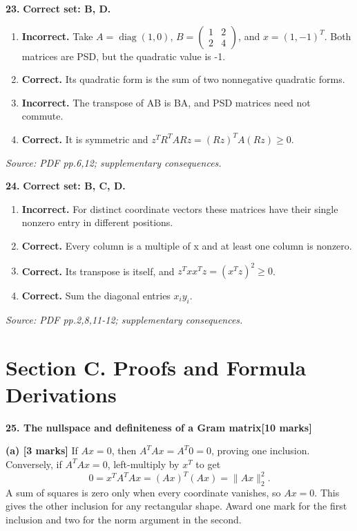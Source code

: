 \documentclass[11pt,a4paper]{article}
\begin{document}
\par\noindent\begin{minipage}{\linewidth}
\textbf{23.} \textbf{Correct set: B, D.}
\begin{enumerate}[label=(\Alph*),leftmargin=8mm,itemsep=2pt,topsep=2pt]
\item \textbf{Incorrect.} Take \(A=\operatorname{diag}(1,0)\), \(B=\begin{pmatrix}1&2\\2&4\end{pmatrix}\), and \(x=(1,-1)^T\). Both matrices are PSD, but the quadratic value is -1.
\item \textbf{Correct.} Its quadratic form is the sum of two nonnegative quadratic forms.
\item \textbf{Incorrect.} The transpose of AB is BA, and PSD matrices need not commute.
\item \textbf{Correct.} It is symmetric and \(z^TR^TARz=(Rz)^TA(Rz)\geq0\).
\end{enumerate}
{\footnotesize\textit{Source: PDF pp.6,12; supplementary consequences.}}

\end{minipage}\par\vspace{3mm}
\par\noindent\begin{minipage}{\linewidth}
\textbf{24.} \textbf{Correct set: B, C, D.}
\begin{enumerate}[label=(\Alph*),leftmargin=8mm,itemsep=2pt,topsep=2pt]
\item \textbf{Incorrect.} For distinct coordinate vectors these matrices have their single nonzero entry in different positions.
\item \textbf{Correct.} Every column is a multiple of x and at least one column is nonzero.
\item \textbf{Correct.} Its transpose is itself, and \(z^Txx^Tz=(x^Tz)^2\geq0\).
\item \textbf{Correct.} Sum the diagonal entries \(x_i y_i\).
\end{enumerate}
{\footnotesize\textit{Source: PDF pp.2,8,11-12; supplementary consequences.}}

\end{minipage}\par\vspace{3mm}
\newpage\section*{Section C. Proofs and Formula Derivations}
\textbf{25. The nullspace and definiteness of a Gram matrix}\hfill\textbf{[10 marks]}\par\medskip
\textbf{(a) [3 marks]} If \(Ax=0\), then \(A^TAx=A^T0=0\), proving one inclusion. Conversely, if \(A^TAx=0\), left-multiply by \(x^T\) to get \[0=x^TA^TAx=(Ax)^T(Ax)=\|Ax\|_2^2.\] A sum of squares is zero only when every coordinate vanishes, so \(Ax=0\). This gives the other inclusion for any rectangular shape. Award one mark for the first inclusion and two for the norm argument in the second.
\end{document}
